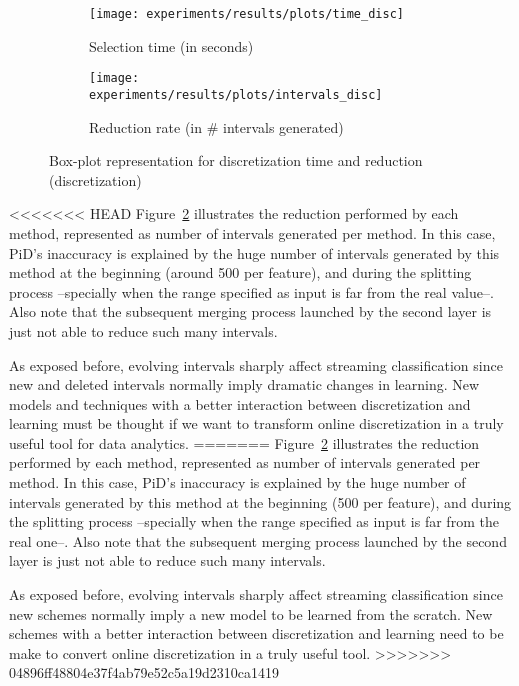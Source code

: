 \documentclass[preprint,12pt]{elsarticle}
\begin{document}
\begin{figure}
\begin{subfigure}{.5\textwidth}
  \centering
  \texttt{[image: experiments/results/plots/time\_disc]}
  \caption{Selection time (in seconds)}
  \label{fig:time-disc}
\end{subfigure}%
\begin{subfigure}{.5\textwidth}
  \centering
  \texttt{[image: experiments/results/plots/intervals\_disc]}
  \caption{Reduction rate (in \# intervals generated)}
  \label{fig:interv-disc}
\end{subfigure}
\caption{Box-plot representation for discretization time and reduction (discretization)}
\label{fig:disc}
\end{figure}

<<<<<<< HEAD
Figure~\ref{fig:interv-disc} illustrates the reduction performed by each method, represented as number of intervals generated per method. In this case, PiD's inaccuracy is explained by the huge number of intervals generated by this method at the beginning (around 500 per feature), and during the splitting process --specially when the range specified as input is far from the real value--. Also note that the subsequent merging process launched by the second layer is just not able to reduce such many intervals.

As exposed before, evolving intervals sharply affect streaming classification since new and deleted intervals normally imply dramatic changes in learning. New models and techniques with a better interaction between discretization and learning must be thought if we want to transform online discretization in a truly useful tool for data analytics.
=======
Figure~\ref{fig:interv-disc} illustrates the reduction performed by each method, represented as number of intervals generated per method. In this case, PiD's inaccuracy is explained by the huge number of intervals generated by this method at the beginning (500 per feature), and during the splitting process --specially when the range specified  as input is far from the real one--. Also note that the subsequent merging process launched by the second layer is just not able to reduce such many intervals.

As exposed before, evolving intervals sharply affect streaming classification since new schemes normally imply a new model to be learned from the scratch. New schemes with a better interaction between discretization and learning need to be make to convert online discretization in a truly useful tool.
>>>>>>> 04896ff48804e37f4ab79e52c5a19d2310ca1419
\end{document}
